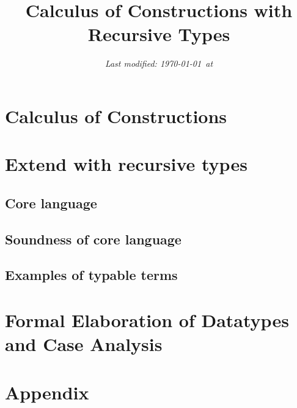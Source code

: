 \documentclass[oneside,a4paper]{article}
\title{\bf Calculus of Constructions with Recursive Types}
\author{}
\date{\small \it Last modified: \today\ at \currenttime}
\theoremstyle{break}
\begin{document}
\maketitle

\section{Calculus of Constructions}

\section{Extend with recursive types}
\subsection{Core language}

\subsection{Soundness of core language}

\subsection{Examples of typable terms}

\section{Formal Elaboration of Datatypes and Case Analysis}

\nocite{*}  

\appendix
\section{Appendix}

\end{document}
